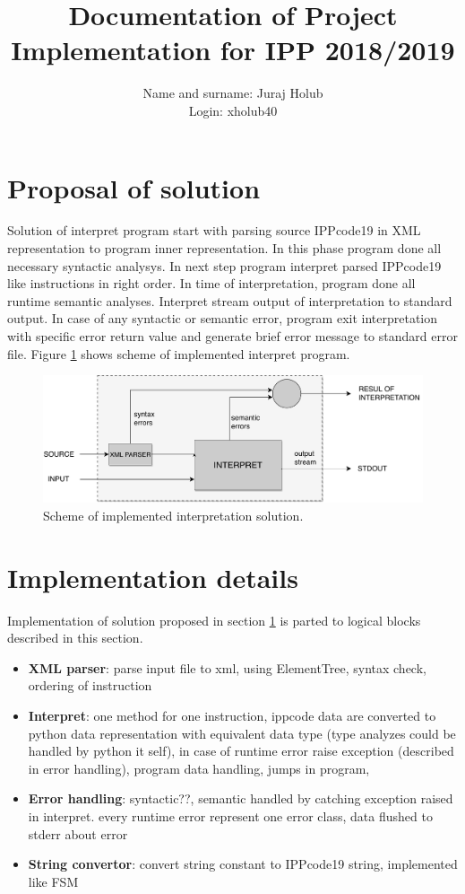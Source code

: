 \documentclass[a4paper, 10pt]{article}
\title{Documentation of Project Implementation for IPP 2018/2019 }
\author{Name and surname: Juraj Holub\\ Login: xholub40}
\date{}
\begin{document}
	\maketitle
	\thispagestyle{empty}

\section{Proposal of solution} \label{proposal}

Solution of interpret program start with parsing source IPPcode19 in XML representation to program inner representation. In this phase program done all necessary syntactic analysys. In next step program interpret parsed IPPcode19 like instructions in right order. In time of interpretation, program done all runtime semantic analyses. Interpret stream output of interpretation to standard output. In case of any syntactic or semantic error, program exit interpretation with specific error return value and generate brief error message to standard error file.
Figure \ref{obr1} shows scheme of implemented interpret program.

\begin{figure}[H] 
	\centering
	\includegraphics[width=.8 \paperwidth]{interpret.pdf}
	\caption{Scheme of implemented interpretation solution.}
	\label{obr1}
\end{figure} 

\section{Implementation details}
Implementation of solution proposed in section \ref{proposal} is parted to logical blocks described in this section.
\begin{itemize}
	\item \textbf{XML parser}: parse input file to xml, using ElementTree, syntax check, ordering of instruction
	\item \textbf{Interpret}: one method for one instruction, ippcode data are converted to python data representation with equivalent data type (type analyzes could be handled by python it self), in case of runtime error raise exception (described in error handling), program data handling, jumps in program, 
	\item \textbf{Error handling}: syntactic??, semantic handled by catching exception raised in interpret. every runtime error represent one error class, data flushed to stderr about error
	\item \textbf{String convertor}: convert string constant to IPPcode19 string, implemented like FSM
\end{itemize}
\end{document}
